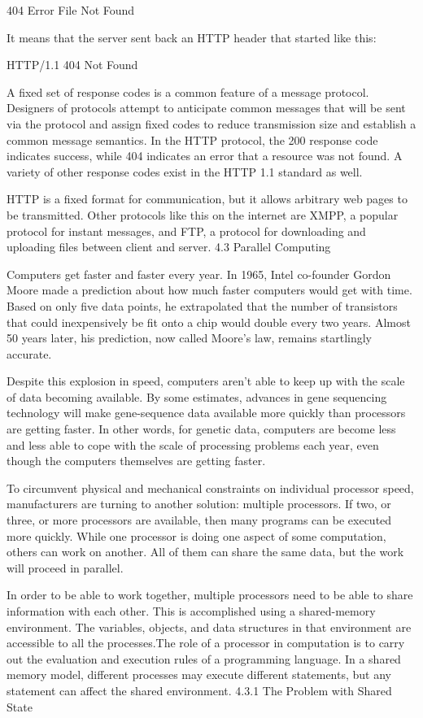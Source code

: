 \documentclass[letterpaper,10pt,dvipdfmx]{sphinxmanual}
\begin{document}
404 Error File Not Found

It means that the server sent back an HTTP header that started like this:

HTTP/1.1 404 Not Found

A fixed set of response codes is a common feature of a message protocol. Designers of protocols attempt to anticipate common messages that will be sent via the protocol and assign fixed codes to reduce transmission size and establish a common message semantics. In the HTTP protocol, the 200 response code indicates success, while 404 indicates an error that a resource was not found. A variety of other response codes exist in the HTTP 1.1 standard as well.

HTTP is a fixed format for communication, but it allows arbitrary web pages to be transmitted. Other protocols like this on the internet are XMPP, a popular protocol for instant messages, and FTP, a protocol for downloading and uploading files between client and server.
4.3   Parallel Computing

Computers get faster and faster every year. In 1965, Intel co-founder Gordon Moore made a prediction about how much faster computers would get with time. Based on only five data points, he extrapolated that the number of transistors that could inexpensively be fit onto a chip would double every two years. Almost 50 years later, his prediction, now called Moore's law, remains startlingly accurate.

Despite this explosion in speed, computers aren't able to keep up with the scale of data becoming available. By some estimates, advances in gene sequencing technology will make gene-sequence data available more quickly than processors are getting faster. In other words, for genetic data, computers are become less and less able to cope with the scale of processing problems each year, even though the computers themselves are getting faster.

To circumvent physical and mechanical constraints on individual processor speed, manufacturers are turning to another solution: multiple processors. If two, or three, or more processors are available, then many programs can be executed more quickly. While one processor is doing one aspect of some computation, others can work on another. All of them can share the same data, but the work will proceed in parallel.

In order to be able to work together, multiple processors need to be able to share information with each other. This is accomplished using a shared-memory environment. The variables, objects, and data structures in that environment are accessible to all the processes.The role of a processor in computation is to carry out the evaluation and execution rules of a programming language. In a shared memory model, different processes may execute different statements, but any statement can affect the shared environment.
4.3.1   The Problem with Shared State
\end{document}
